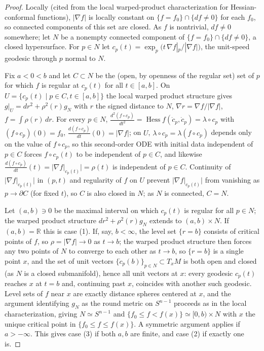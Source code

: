 \begin{proof}
  Locally (cited from the local warped-product characterization for
  Hessian-conformal functions), $|\nabla f|$ is locally constant on
  $\{f=f_0\}\cap\{df\ne0\}$ for each $f_0$, so connected components of this set are
  closed. As $f$ is nontrivial, $df\ne0$ somewhere; let $N$ be a nonempty connected
  component of $\{f=f_0\}\cap\{df\ne0\}$, a closed hypersurface. For $p\in N$ let
  $c_p(t)=\exp_p\!\big(t\,\nabla f|_p/|\nabla f|\big)$, the unit-speed geodesic
  through $p$ normal to $N$.

  Fix $a<0<b$ and let $C\subset N$ be the (open, by openness of the regular set) set
  of $p$ for which $f$ is regular at $c_p(t)$ for all $t\in[a,b]$. On
  $U=\{c_p(t)\mid p\in C,t\in[a,b]\}$ the local warped product structure gives
  $g|_U=dr^2+\rho^2(r)g_N$ with $r$ the signed distance to $N$,
  $\nabla r=\nabla f/|\nabla f|$, $f=\int\rho(r)\,dr$. For every $p\in N$,
  $\frac{d^2(f\circ c_p)}{dt^2}=\operatorname{Hess}f(\dot c_p,\dot c_p)=\lambda\circ c_p$
  with $(f\circ c_p)(0)=f_0$, $\frac{d(f\circ c_p)}{dt}(0)=|\nabla f|$; on $U$,
  $\lambda\circ c_p=\lambda(f\circ c_p)$ depends only on the value of
  $f\circ c_p$, so this second-order ODE with initial data independent of
  $p\in C$ forces $f\circ c_p(t)$ to be independent of $p\in C$, and likewise
  $\frac{d(f\circ c_p)}{dt}(t)=|\nabla f|_{c_p(t)}|=\rho(t)$ is independent of
  $p\in C$. Continuity of $|\nabla f|_{c_p(t)}|$ in $(p,t)$ and regularity of $f$
  on $U$ prevent $|\nabla f|_{c_p(t)}|$ from vanishing as $p\to\partial C$ (for
  fixed $t$), so $C$ is also closed in $N$; as $N$ is connected, $C=N$.

  Let $(a,b)\ni0$ be the maximal interval on which $c_p(t)$ is regular for all
  $p\in N$; the warped product structure $dr^2+\rho^2(r)g_N$ extends to
  $(a,b)\times N$. If $(a,b)=\mathbb R$ this is case (1). If, say, $b<\infty$, the
  level set $\{r=b\}$ consists of critical points of $f$, so $\rho=|\nabla f|\to0$
  as $t\to b$; the warped product structure then forces any two points of $N$ to
  converge to each other as $t\to b$, so $\{r=b\}$ is a single point $x$, and the
  set of unit vectors $\{\dot c_p(b)\}_{p\in N}\subset T_xM$ is both open and closed
  (as $N$ is a closed submanifold), hence all unit vectors at $x$: every geodesic
  $c_p(t)$ reaches $x$ at $t=b$ and, continuing past $x$, coincides with another
  such geodesic. Level sets of $f$ near $x$ are exactly distance spheres centered
  at $x$, and the argument identifying $g_N$ as the round metric on $S^{n-1}$
  proceeds as in the local characterization, giving $N\simeq S^{n-1}$ and
  $\{f_0\le f<f(x)\}\simeq[0,b)\times N$ with $x$ the unique critical point in
  $\{f_0\le f\le f(x)\}$. A symmetric argument applies if $a>-\infty$. This gives
  case (3) if both $a,b$ are finite, and case (2) if exactly one is.
\end{proof}


